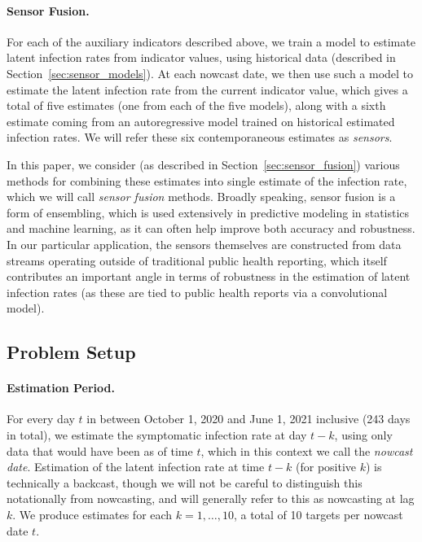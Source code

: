 \documentclass[sts]{imsart}
\theoremstyle{plain}
\theoremstyle{definition}
\theoremstyle{remark}
\begin{document}
\smallskip
\paragraph*{Sensor Fusion.}  

For each of the auxiliary indicators described above, we train a model to
estimate latent infection rates from indicator values, using historical data
(described in Section~\ref{sec:sensor_models}). At each nowcast date, we then  
use such a model to estimate the latent infection rate from the current
indicator value, which gives a total of five estimates (one from each of the
five models), along with a sixth estimate coming from an autoregressive model 
trained on historical estimated infection rates. We will refer these six 
contemporaneous estimates as \emph{sensors}.

In this paper, we consider (as described in Section~\ref{sec:sensor_fusion})
various methods for combining these estimates into single estimate of the 
infection rate, which we will call \emph{sensor fusion} methods. Broadly
speaking, sensor fusion is a form of ensembling, which is used extensively 
in predictive modeling in statistics and machine learning, as it can often help
improve both accuracy and robustness. In our particular application, the sensors
themselves are constructed from data streams operating outside of traditional 
public health reporting, which itself contributes an important angle in terms of
robustness in the estimation of latent infection rates (as these are tied to  
public health reports via a convolutional model). 

\subsection{Problem Setup}
\label{sec:problem_setup}

\paragraph*{Estimation Period.}

For every day $t$ in between October 1, 2020 and June 1, 2021 inclusive (243
days in total), we estimate the symptomatic infection rate at day $t-k$, using  
only data that would have been as of time $t$, which in this context we call the  
\emph{nowcast date}. Estimation of the latent infection rate at time $t-k$ (for
positive $k$) is technically a backcast, though we will not be careful to
distinguish this notationally from nowcasting, and will generally refer to this
as nowcasting at lag $k$. We produce estimates for each $k=1,\ldots,10$, a total  
of 10 targets per nowcast date $t$. 
\end{document}
